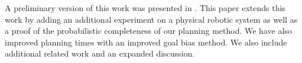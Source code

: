 
A preliminary version of this work was presented in \cite{McConachie2017}. This paper extends this work by adding an additional experiment on a physical robotic system as well as a proof of the probabilistic completeness of our planning method. We have also improved planning times with an improved goal bias method. We also include additional related work and an expanded discussion.